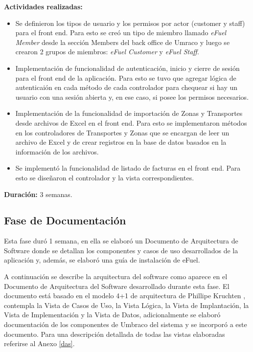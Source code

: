 \vspace{0.3cm}
\textbf{Actividades realizadas:}
\begin{itemize}
    \item Se definieron los tipos de usuario y los permisos por actor (customer y staff) para el front end. Para esto se creó un tipo de miembro llamado \emph{eFuel Member} desde la sección Members del back office de Umraco y luego se crearon 2 grupos de miembros: \emph{eFuel Customer} y \emph{eFuel Staff}.
    \item Implementación de funcionalidad de autenticación, inicio y cierre de sesión para el front end de la aplicación. Para esto se tuvo que agregar lógica de autenticaión en cada método de cada controlador para chequear si hay un usuario con una sesión abierta y, en ese caso, si posee los permisos necesarios.
    \item Implementación de la funcionalidad de importación de Zonas y Transportes desde archivos de Excel en el front end. Para esto se implementaron métodos en los controladores de Transportes y Zonas que se encargan de leer un archivo de Excel y de crear registros en la base de datos basados en la información de los archivos.
    \item Se implementó la funcionalidad de listado de facturas en el front end. Para esto se diseñaron el controlador y la vista correspondientes.
\end{itemize}

\textbf{Duración:} 3 semanas.

\subsection{Fase de Documentación} \label{documentation}
Esta fase duró 1 semana, en ella se elaboró un Documento de Arquitectura de Software donde se detallan los componentes y casos de uso desarrollados de la aplicación y, además, se elaboró una guía de instalación de eFuel.

A continuación se describe la arquitectura del software como aparece en el Documento de Arquitectura del Software desarrollado durante esta fase. El documento está basado en el modelo 4+1 de arquitectura de Phillipe Kruchten \cite{41Kruchten}, contempla la Vista de Casos de Uso, la Vista Lógica, la Vista de Implantación, la Vista de Implementación y la Vista de Datos, adicionalmente se elaboró documentación de los componentes de Umbraco del sistema y se incorporó a este documento. Para una descripción detallada de todas las vistas elaboradas referirse al Anexo \ref{das}.

